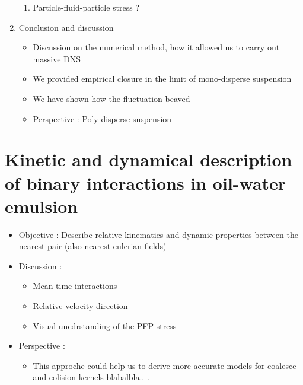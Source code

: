 \documentclass[12pt]{book}
\begin{document}
\begin{enumerate}
\begin{enumerate}
        \item Particle-fluid-particle stress ?
    \end{enumerate}
    \item Conclusion and discussion
    \begin{itemize}
        \item Discussion on the numerical method, how it allowed us to carry out massive DNS
        \item We provided empirical closure in the limit of mono-disperse suspension
        \item We have shown how the fluctuation beaved
        \item Perspective : Poly-disperse suspension
    \end{itemize}
\end{enumerate}


\section{Kinetic and dynamical description of binary interactions in oil-water emulsion}
\begin{itemize}
    \item Objective :  Describe relative kinematics   and dynamic properties between the nearest pair (also nearest eulerian fields)
    \item Discussion :
    \begin{itemize}
        \item Mean time interactions
        \item Relative velocity direction 
        \item Visual unedrstanding of the PFP stress
    \end{itemize}
    \item Perspective :
    \begin{itemize}
        \item This approche could help us to derive more accurate models for coalesce and colision kernels blabalbla.. .
    \end{itemize}
\end{itemize}
\end{document}
